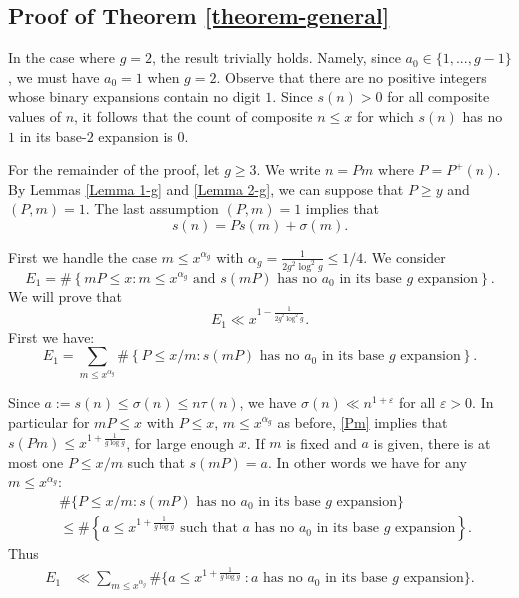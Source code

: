 \documentclass[11pt, reqno]{amsart}
\theoremstyle{remark}
\numberwithin{theorem}{section}
\numberwithin{proposition}{section}
\numberwithin{lemma}{section}
\numberwithin{corollary}{section}
\numberwithin{equation}{section}
\numberwithin{conjecture}{section}
\numberwithin{definition}{section}
\begin{document}
\subsection{Proof of Theorem \ref{theorem-general}}
In the case where $g = 2$, the result trivially holds. Namely, since $a_0 \in \{1,...,g-1\}$, we must have $a_0 = 1$ when $g = 2$. Observe that there are no positive integers whose binary expansions contain no digit $1$. Since $s(n) > 0$ for all composite values of $n$, it follows that the count of composite $n \leq x$ for which $s(n)$ has no $1$ in its base-$2$ expansion is $0$. 

For the remainder of the proof, let $g \geq 3.$ We write $n=Pm$ where $P=P^+(n)$. By Lemmas \ref{Lemma 1-g} and \ref{Lemma 2-g}, we can suppose that $P\geq y$ and $(P,m)=1$.
The last assumption $(P,m)=1$ implies that 
\begin{equation}
\label{Pm}
s(n)=Ps(m)+\sigma (m). 
\end{equation}

First we handle the case $m\leqslant x^{\alpha_g}$ with $\alpha_g ={\frac{1}{2g^2\log^2 g}}\leq 1/4$. 
We consider
\[
E_1=\#\left\{
mP\leqslant x : m\leqslant x^{\alpha_g}  \text{ and } s(mP) \text{ has no $a_0$ in its base $g$ expansion}
\right\}.
\]
We will prove that
\begin{equation}\label{maj:E1}
E_1\ll x^{1-\frac{1}{2g^2\log ^2 g}}.
\end{equation}
First we have:
\[
E_1=\sum_{m\leqslant x^{\alpha_g}}
\#\left\{
P\leqslant x/m : s(mP) \text{ has no $a_0$ in its base $g$ expansion}
\right\}.
\]

Since $a:=s(n)\leqslant\sigma (n)\le n\tau (n)$, we have $\sigma(n)\ll n^{1+\varepsilon}$ for all $\varepsilon >0$. In particular for $mP\leqslant x$ with $P\le x$, $m\le x^{\alpha_g}$ as before,
\eqref{Pm} implies that $s(Pm)\leqslant x^{1+\frac{1}{g\log g}}$, for large enough $x$.
 If $m$ is fixed and  $a$ is given, there is at most one $P\leqslant x/m$
 such that $s(mP)=a$. In other words we have for any $m\leqslant x^{\alpha_g}$:
 \begin{equation*}
 \begin{split}
 &\#\{ P\le x/m : s(mP) \text{ has no $a_0$ in its base $g$ expansion}\}\\
 &\leqslant\#\left\{
 a\leqslant x^{1+\frac{1}{g\log g}}
 \text{ such that $a$ has no $a_0$ in its base $g$ expansion}
 \right\}.
 \end{split}
 \end{equation*}
Thus
\begin{equation}\label{small_m}
\begin{split}
E_1&\ll\sum_{m\leqslant x^{\alpha_g}}\#\{a\le x^{1+\frac{1}{g\log  g}}\ :a \text{ has no $a_0$ in its base $g$ expansion}\}.
\end{split}
\end{equation}
\end{document}
